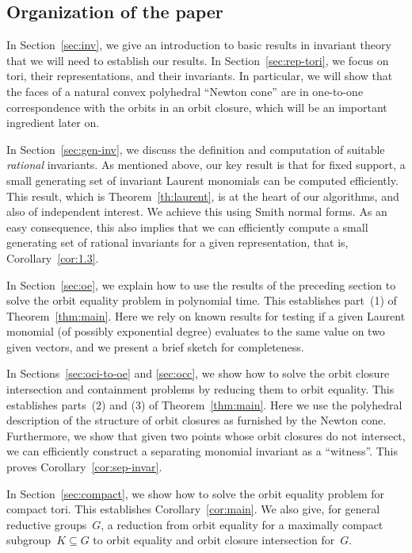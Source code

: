 \documentclass[10pt,a4paper]{article}
\theoremstyle{definition}
\numberwithin{equation}{section}
\begin{document}
%
%
%
%
%
%
%
%
%

%
\subsection{Organization of the paper}\label{subsec:organization}
%
In Section~\ref{sec:inv}, we give an introduction to basic results in invariant theory that we will need to establish our results.
In Section~\ref{sec:rep-tori}, we focus on tori, their representations, and their invariants.
In particular, we will show that the faces of a natural convex polyhedral ``Newton cone'' are in one-to-one correspondence with the orbits in an orbit closure, which will be an important ingredient later on.

In Section~\ref{sec:gen-inv}, we discuss the definition and computation of suitable \emph{rational} invariants.
As mentioned above, our key result is that for fixed support, a small generating set of invariant Laurent monomials can be computed efficiently.
This result, which is Theorem~\ref{th:laurent}, is at the heart of our algorithms, and also of independent interest.
We achieve this using Smith normal forms.
As an easy consequence, this also implies that we can efficiently compute a small generating set of rational invariants for a given representation, that is, Corollary~\ref{cor:1.3}.

In Section~\ref{sec:oe}, we explain how to use the results of the preceding section to solve the orbit equality problem in polynomial time.
This establishes part~(1) of Theorem~\ref{thm:main}.
Here we rely on known results for testing if a given Laurent monomial (of possibly exponential degree) evaluates to the same value on two given vectors, and we present a brief sketch for completeness.

In Sections~\ref{sec:oci-to-oe} and \ref{sec:occ}, we show how to solve the orbit closure intersection and containment problems by reducing them to orbit equality.
This establishes parts~(2) and (3) of Theorem~\ref{thm:main}.
Here we use the polyhedral description of the structure of orbit closures as furnished by the Newton cone.
Furthermore, we show that given two points whose orbit closures do not intersect, we can efficiently construct a separating monomial invariant as a ``witness''.
This proves Corollary~\ref{cor:sep-invar}.

In Section~\ref{sec:compact}, we show how to solve the orbit equality problem for compact tori.
This establishes Corollary~\ref{cor:main}.
We also give, for general reductive groups~$G$, a reduction from orbit equality for a maximally compact subgroup~$K\subseteq G$ to orbit equality and orbit closure intersection for~$G$.
\end{document}
